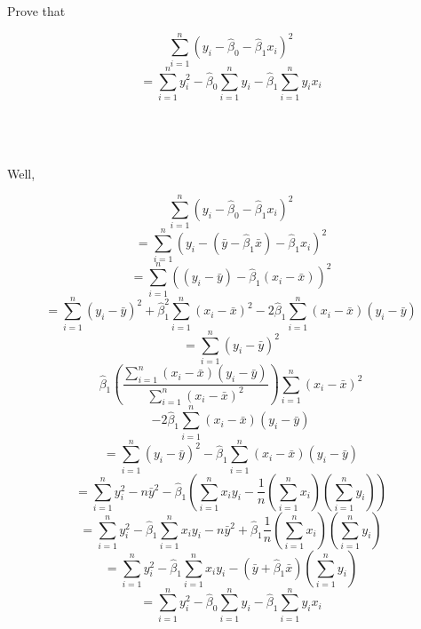 Prove that

$$\sum_{i=1}^n(y_i-\hat{\beta}_0-\hat{\beta}_1x_i)^2$$
$$=\sum_{i=1}^ny_i^2-\hat{\beta}_0\sum_{i=1}^ny_i-\hat{\beta}_1\sum_{i=1}^ny_ix_i$$\\\\

\begin{solution}\renewcommand{\qedsymbol}{}\ \\
    Well,
    
    $$\sum_{i=1}^n(y_i-\hat{\beta}_0-\hat{\beta}_1x_i)^2$$
    $$=\sum_{i=1}^n(y_i-(\bar{y}-\hat{\beta}_1\bar{x})-\hat{\beta}_1x_i)^2$$
    $$=\sum_{i=1}^n((y_i-\bar{y})-\hat{\beta}_1(x_i-\bar{x}))^2$$
    $$=\sum_{i=1}^n(y_i-\bar{y})^2+\hat{\beta}_1^2\sum_{i=1}^n(x_i-\bar{x})^2-
    2\hat{\beta}_1\sum_{i=1}^n(x_i-\bar{x})(y_i-\bar{y})$$
    $$=\sum_{i=1}^n(y_i-\bar{y})^2$$
    $$\hat{\beta}_1(\frac{\sum_{i=1}^n(x_i-\bar{x})(y_i-\bar{y})}{\sum_{i=1}^n(x_i-\bar{x})^2})
    \sum_{i=1}^n(x_i-\bar{x})^2$$
    $$-2\hat{\beta}_1\sum_{i=1}^n(x_i-\bar{x})(y_i-\bar{y})$$
    $$=\sum_{i=1}^n(y_i-\bar{y})^2-\hat{\beta}_1\sum_{i=1}^n(x_i-\bar{x})(y_i-\bar{y})$$
    $$=\sum_{i=1}^ny_i^2-
    n\bar{y}^2-\hat{\beta}_1(\sum_{i=1}^nx_iy_i-\frac1n(\sum_{i=1}^nx_i)(\sum_{i=1}^ny_i))$$
    $$=\sum_{i=1}^ny_i^2-
    \hat{\beta}_1\sum_{i=1}^nx_iy_i-n\bar{y}^2+\hat{\beta}_1\frac1n(\sum_{i=1}^nx_i)(\sum_{i=1}^ny_i)$$
    $$=\sum_{i=1}^ny_i^2-
    \hat{\beta}_1\sum_{i=1}^nx_iy_i-(\bar{y}+\hat{\beta}_1\bar{x})(\sum_{i=1}^ny_i)$$
    $$=\sum_{i=1}^ny_i^2-\hat{\beta}_0\sum_{i=1}^ny_i-\hat{\beta}_1\sum_{i=1}^ny_ix_i$$

\end{solution}